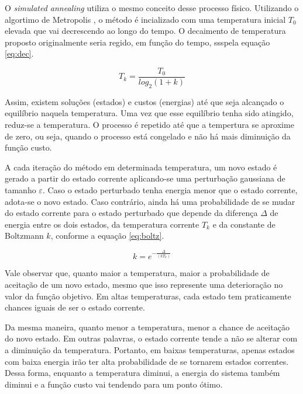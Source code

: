 \documentclass[conference,compsoc]{IEEEtran}
\begin{document}
O \textit{simulated annealing} utiliza o mesmo conceito desse processo físico. Utilizando o algortimo de 
Metropolis \cite{metropolis}, o método é incializado com uma temperatura inicial $T_0$ elevada que vai decrescendo ao longo do tempo. O decaimento de temperatura proposto originalmente seria regido, em função do tempo, ssspela equação \ref{eq:dec}.

\begin{equation}
T_k = \frac{T_0}{log_2(1+k)}
\label{eq:dec}
\end{equation}

\vspace{0.5cm}

Assim, existem soluções (estados) e custos (energias) até que seja alcançado o equilíbrio naquela temperatura. Uma vez que esse equilíbrio tenha sido atingido, reduz-se a temperatura. O processo é repetido até que a tempertura se aproxime de zero, ou seja, quando o processo está congelado e não há mais diminuição da função custo.

A cada iteração do método em determinada temperatura, um novo estado é gerado a partir do estado corrente aplicando-se uma perturbação gaussiana de tamanho $\varepsilon$. Caso o estado perturbado tenha energia menor que o estado corrente, adota-se o novo estado. Caso contrário, ainda há uma probabilidade de se mudar do estado corrente para o estado perturbado que depende da diferença $\Delta$ de energia entre os dois estados, da temperatura corrente $T_k$ e da constante de Boltzmann $k$, conforme a equação \ref{eq:boltz}.

\begin{equation}
k = e^{-\frac{\Delta}{(kT_k)}}
\label{eq:boltz}
\end{equation}

\vspace{0.3cm}

Vale observar que, quanto maior a temperatura, maior a probabilidade de aceitação de um novo estado, mesmo que isso represente uma deterioração no valor da função objetivo. Em altas temperaturas, cada estado tem praticamente chances iguais de ser o estado corrente. 

Da mesma maneira, quanto menor a temperatura, menor a chance de aceitação do novo estado. Em outras palavras, o estado corrente tende a não se alterar com a diminuição da temperatura. Portanto, em baixas temperaturas, apenas estados com baixa energia irão ter alta probabilidade de se tornarem estados correntes. Dessa forma, enquanto a temperatura diminui, a energia do sistema também diminui e a função custo vai tendendo para um ponto ótimo.
\end{document}
